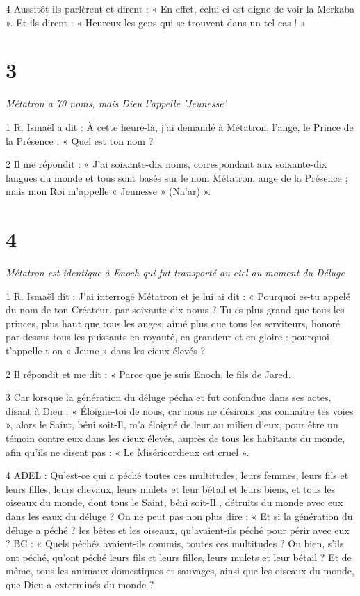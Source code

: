 \par 4 Aussitôt ils parlèrent et dirent : « En effet, celui-ci est digne de voir la Merkaba ». Et ils dirent : « Heureux les gens qui se trouvent dans un tel cas ! »

\chapter{3}

\par \textit{Métatron a 70 noms, mais Dieu l'appelle 'Jeunesse'}

\par 1 R. Ismaël a dit : À cette heure-là, j'ai demandé à Métatron, l'ange, le Prince de la Présence : « Quel est ton nom ?

\par 2 Il me répondit : « J'ai soixante-dix noms, correspondant aux soixante-dix langues du monde et tous sont basés sur le nom Métatron, ange de la Présence ; mais mon Roi m'appelle « Jeunesse » (Na'ar) ».

\chapter{4}

\par \textit{Métatron est identique à Enoch qui fut transporté au ciel au moment du Déluge}

\par 1 R. Ismaël dit : J'ai interrogé Métatron et je lui ai dit : « Pourquoi es-tu appelé du nom de ton Créateur, par soixante-dix noms ? Tu es plus grand que tous les princes, plus haut que tous les anges, aimé plus que tous les serviteurs, honoré par-dessus tous les puissants en royauté, en grandeur et en gloire : pourquoi t'appelle-t-on « Jeune » dans les cieux élevés ?

\par 2 Il répondit et me dit : « Parce que je suis Enoch, le fils de Jared.

\par 3 Car lorsque la génération du déluge pécha et fut confondue dans ses actes, disant à Dieu : « Éloigne-toi de nous, car nous ne désirons pas connaître tes voies », alors le Saint, béni soit-Il, m'a éloigné de leur au milieu d'eux, pour être un témoin contre eux dans les cieux élevés, auprès de tous les habitants du monde, afin qu'ils ne disent pas : « Le Miséricordieux est cruel ».

\par 4 ADEL : Qu'est-ce qui a péché toutes ces multitudes, leurs femmes, leurs fils et leurs filles, leurs chevaux, leurs mulets et leur bétail et leurs biens, et tous les oiseaux du monde, dont tous le Saint, béni soit-Il , détruits du monde avec eux dans les eaux du déluge ? On ne peut pas non plus dire : « Et si la génération du déluge a péché ? les bêtes et les oiseaux, qu'avaient-ils péché pour périr avec eux ? BC : « Quels péchés avaient-ils commis, toutes ces multitudes ? Ou bien, s'ils ont péché, qu'ont péché leurs fils et leurs filles, leurs mulets et leur bétail ? Et de même, tous les animaux domestiques et sauvages, ainsi que les oiseaux du monde, que Dieu a exterminés du monde ?

